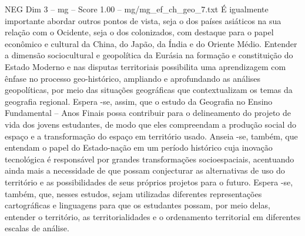 \begin{textsample}{NEG Dim 3 – mg – Score 1.00 – mg/mg\_ef\_ch\_geo\_7.txt}
É igualmente importante abordar outros pontos de vista, seja o dos países asiáticos na sua relação com o Ocidente, seja o dos colonizados, com destaque para o papel econômico e cultural da China, do Japão, da Índia e do Oriente Médio.
Entender a dimensão sociocultural e geopolítica da Eurásia na formação e constituição do Estado Moderno e nas disputas territoriais possibilita uma aprendizagem com ênfase no processo geo-histórico, ampliando e aprofundando as análises geopolíticas, por meio das situações geográficas que contextualizam os temas da geografia regional.
Espera -se, assim, que o estudo da Geografia no Ensino Fundamental – Anos Finais possa contribuir para o delineamento do projeto de vida dos jovens estudantes, de modo que eles compreendam a produção social do espaço e a transformação do espaço em território usado.
Anseia -se, também, que entendam o papel do Estado-nação em um período histórico cuja inovação tecnológica é responsável por grandes transformações socioespaciais, acentuando ainda mais a necessidade de que possam conjecturar as alternativas de uso do território e as possibilidades de seus próprios projetos para o futuro.
Espera -se, também, que, nesses estudos, sejam utilizadas diferentes representações cartográficas e linguagens para que os estudantes possam, por meio delas, entender o território, as territorialidades e o ordenamento territorial em diferentes escalas de análise.

\end{textsample}
